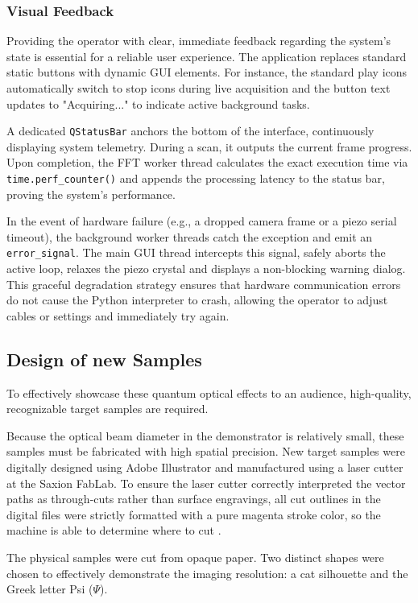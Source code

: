 \documentclass[12pt,a4paper]{article}
\begin{document}
        \subsubsection{Visual Feedback}
        Providing the operator with clear, immediate feedback regarding the system's state is essential for a reliable user experience. The application replaces standard static buttons with dynamic \ac{GUI} elements. For instance, the standard play icons automatically switch to stop icons during live acquisition and the button text updates to "Acquiring..." to indicate active background tasks.

        A dedicated \texttt{QStatusBar} anchors the bottom of the interface, continuously displaying system telemetry. During a scan, it outputs the current frame progress. Upon completion, the \ac{FFT} worker thread calculates the exact execution time via \texttt{time.perf\_counter()} and appends the processing latency to the status bar, proving the system's performance.

        In the event of hardware failure (e.g., a dropped camera frame or a piezo serial timeout), the background worker threads catch the exception and emit an \texttt{error\_signal}. The main \ac{GUI} thread intercepts this signal, safely aborts the active loop, relaxes the piezo crystal and displays a non-blocking warning dialog. This graceful degradation strategy ensures that hardware communication errors do not cause the Python interpreter to crash, allowing the operator to adjust cables or settings and immediately try again.

    \subsection{Design of new Samples}
    To effectively showcase these quantum optical effects to an audience, high-quality, recognizable target samples are required. 

    Because the optical beam diameter in the demonstrator is relatively small, these samples must be fabricated with high spatial precision. New target samples were digitally designed using Adobe Illustrator and manufactured using a laser cutter at the Saxion FabLab. To ensure the laser cutter correctly interpreted the vector paths as through-cuts rather than surface engravings, all cut outlines in the digital files were strictly formatted with a pure magenta stroke color, so the machine is able to determine where to cut \cite{Fablabwiki}.  

    The physical samples were cut from opaque paper. Two distinct shapes were chosen to effectively demonstrate the imaging resolution: a cat silhouette and the Greek letter Psi ($\Psi$). 
\end{document}
